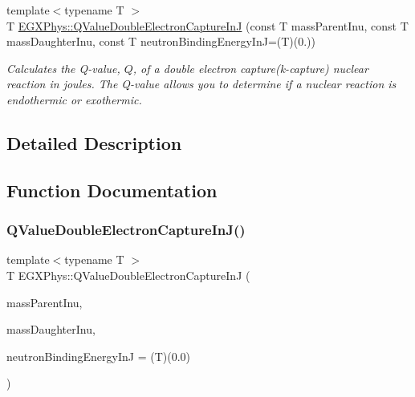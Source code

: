 \begin{DoxyCompactItemize}
{\footnotesize template$<$typename T $>$ }\\T \mbox{\hyperlink{group___e_g_x_phys-_q_value-_electron_capture_gacb431a07ac565f8e48a08c25544e5d22}{E\+G\+X\+Phys\+::\+Q\+Value\+Double\+Electron\+Capture\+InJ}} (const T mass\+Parent\+Inu, const T mass\+Daughter\+Inu, const T neutron\+Binding\+Energy\+InJ=(T)(0.))
\begin{DoxyCompactList}\small\item\em Calculates the Q-\/value, $Q$, of a double electron capture(k-\/capture) nuclear reaction in joules. The Q-\/value allows you to determine if a nuclear reaction is endothermic or exothermic. \end{DoxyCompactList}\end{DoxyCompactItemize}


\subsection{Detailed Description}


\subsection{Function Documentation}
\mbox{\label{group___e_g_x_phys-_q_value-_electron_capture_gacb431a07ac565f8e48a08c25544e5d22}} 
\subsubsection{\texorpdfstring{Q\+Value\+Double\+Electron\+Capture\+In\+J()}{QValueDoubleElectronCaptureInJ()}}
{\footnotesize\ttfamily template$<$typename T $>$ \\
T E\+G\+X\+Phys\+::\+Q\+Value\+Double\+Electron\+Capture\+InJ (\begin{DoxyParamCaption}\item[{const T}]{mass\+Parent\+Inu,  }\item[{const T}]{mass\+Daughter\+Inu,  }\item[{const T}]{neutron\+Binding\+Energy\+InJ = {\ttfamily (T)(0.0)} }\end{DoxyParamCaption})}



